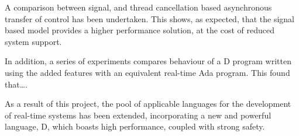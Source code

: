 A comparison between signal, and thread cancellation based asynchronous transfer 
of control has been undertaken. This shows, as expected, that the signal based 
model provides a higher performance solution, at the cost of reduced system support. 

In addition, a series of experiments compares behaviour of a D program written 
using the added features with an equivalent real-time Ada program. This found 
that\ldots. 

As a result of this project, the pool of applicable languages for the development 
of real-time systems has been extended, incorporating a new and powerful language, D, which 
boasts high performance, coupled with strong safety. 





